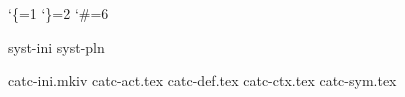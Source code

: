 

\catcode`\{=1 \catcode`\}=2 \catcode`\#=6

\edef\metatexformat {\jobname}
\edef\metatexversion{2007.04.03 13:01}

\let\fmtname   \metatexformat
\let\fmtversion\metatexversion

\ifx\normalinput\undefined \let\normalinput \fi

\def\loadcorefile#1{\normalinput#1\relax}

\loadcorefile{syst-ini}      %
\loadcorefile{syst-pln}      %



\loadcorefile{catc-ini.mkiv} %
\loadcorefile{catc-act.tex}  %
\loadcorefile{catc-def.tex}  %
\loadcorefile{catc-ctx.tex}  %
\loadcorefile{catc-sym.tex}  %



